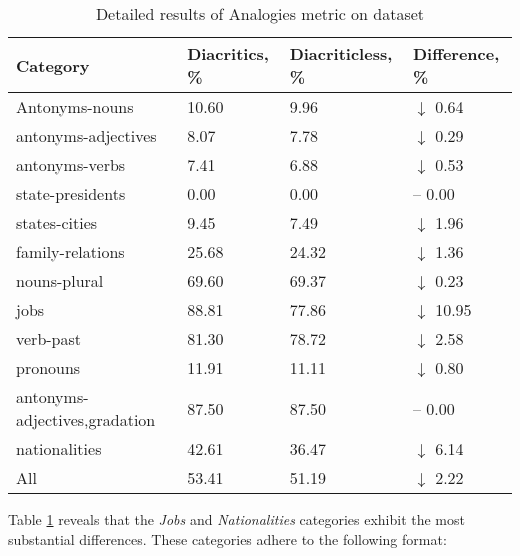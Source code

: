 \documentclass{article}
\begin{document}
\begin{table}[h]
  \centering  
  \begin{tabular}{ |p{4.66cm}||p{2cm}|p{2.4cm}|p{2.1cm}| }
    \hline
    Category                      & Diacritics, \% & Diacriticless, \% & Difference, \%     \\
    \hline
    Antonyms-nouns                & 10.60          & 9.96              & $\downarrow$ 0.64  \\
    antonyms-adjectives           & 8.07           & 7.78              & $\downarrow$ 0.29  \\
    antonyms-verbs                & 7.41           & 6.88              & $\downarrow$ 0.53  \\
    state-presidents              & 0.00           & 0.00              & -- 0.00            \\
    states-cities                 & 9.45           & 7.49              & $\downarrow$ 1.96  \\
    family-relations              & 25.68          & 24.32             & $\downarrow$ 1.36  \\
    nouns-plural                  & 69.60          & 69.37             & $\downarrow$ 0.23  \\
    jobs                          & 88.81          & 77.86             & $\downarrow$ 10.95 \\
    verb-past                     & 81.30          & 78.72             & $\downarrow$ 2.58  \\
    pronouns                      & 11.91          & 11.11             & $\downarrow$ 0.80  \\
    antonyms-adjectives,gradation & 87.50          & 87.50             & -- 0.00            \\
    nationalities                 & 42.61          & 36.47             & $\downarrow$ 6.14  \\
    \hline
    \hline
    All                           & 53.41          & 51.19             & $\downarrow$ 2.22  \\ 
    \hline
  \end{tabular}
  \caption{Detailed results of Analogies metric on dataset}
  \label{embedding_evaluator_detailed}
\end{table}


Table \ref{embedding_evaluator_detailed} reveals that the \textit{Jobs} and \textit{Nationalities} categories exhibit the most substantial differences.
These categories adhere to the following format:
\end{document}
